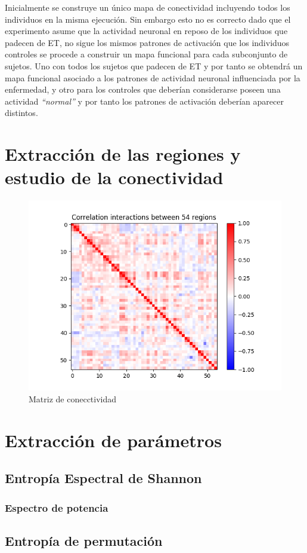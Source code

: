 Inicialmente se construye un único mapa de conectividad incluyendo todos los individuos en la misma ejecución. Sin embargo esto no es correcto dado que el experimento asume que la actividad neuronal en reposo de los individuos que padecen de ET, no sigue los mismos patrones de activación que los individuos controles se procede a construir un mapa funcional para cada subconjunto de sujetos. Uno con todos los sujetos que padecen de ET y por tanto se obtendrá un mapa funcional asociado a los patrones de actividad neuronal influenciada por la enfermedad, y otro para los controles que deberían considerarse poseen una actividad \textit{``normal''} y por tanto los patrones de activación deberían aparecer distintos.
 
\section{Extracción de las regiones y estudio de la conectividad}

\begin{figure}[H]
	\includegraphics[width=\linewidth, height=\textheight, keepaspectratio]{img/conectividad/matrix.png}
	\caption{Matriz de conecctividad}
	\label{preproc:conectividad}
\end{figure}
\section{Extracción de parámetros}
\subsection{Entropía Espectral de Shannon}
\subsubsection{Espectro de potencia}
\subsection{Entropía de permutación}

